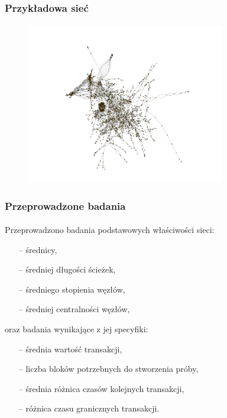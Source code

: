 \documentclass[]{beamer}
\newcommand{\frameheight}{7cm}
\begin{document}
\begin{frame}
 \frametitle{Przykładowa sieć}
 \framesubtitle{}
  \begin{figure}
	\centering
 \includegraphics[height=\frameheight]{pictures/graph/graph.png}
  \end{figure}
\end{frame}


\begin{frame}
 \frametitle{Przeprowadzone badania}
 \framesubtitle{}
 \justify
Przeprowadzono badania podstawowych właściwości sieci:
\begin{itemize}
\item[--] średnicy,
\item[--] średniej długości ścieżek,
\item[--] średniego stopienia węzłów,
\item[--] średniej centralności węzłów,
\end{itemize}
oraz badania wynikające z jej specyfiki:
\begin{itemize}
\item[--] średnia wartość transakcji,
\item[--] liczba bloków potrzebnych do stworzenia próby,
\item[--] średnia różnica czasów kolejnych transakcji,
\item[--] różnica czasu granicznych transakcji.
\end{itemize}
\end{frame}
\end{document}
